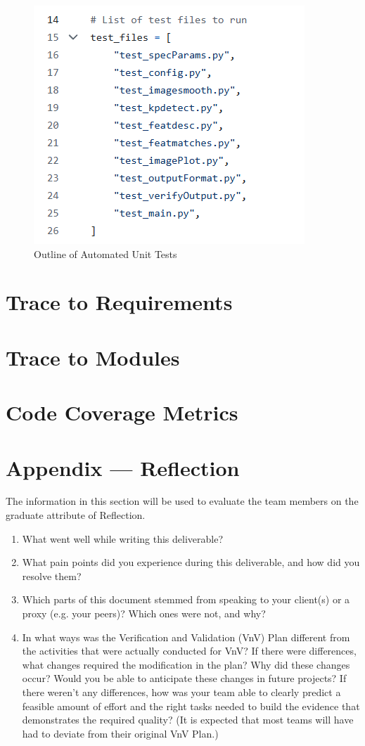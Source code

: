\documentclass[12pt, titlepage]{article}
\begin{document}
\begin{figure}
  \centering
  \includegraphics[width=0.5\linewidth]{images/unit_test_names.png}
  \caption{Outline of Automated Unit Tests}
  \label{unit_tests}
\end{figure}
		
\section{Trace to Requirements}
		
\section{Trace to Modules}		

\section{Code Coverage Metrics}




\newpage{}
\section*{Appendix --- Reflection}

The information in this section will be used to evaluate the team members on the
graduate attribute of Reflection.



\begin{enumerate}
  \item What went well while writing this deliverable? 
  \item What pain points did you experience during this deliverable, and how
    did you resolve them?
  \item Which parts of this document stemmed from speaking to your client(s) or
  a proxy (e.g. your peers)? Which ones were not, and why?
  \item In what ways was the Verification and Validation (VnV) Plan different
  from the activities that were actually conducted for VnV?  If there were
  differences, what changes required the modification in the plan?  Why did
  these changes occur?  Would you be able to anticipate these changes in future
  projects?  If there weren't any differences, how was your team able to clearly
  predict a feasible amount of effort and the right tasks needed to build the
  evidence that demonstrates the required quality?  (It is expected that most
  teams will have had to deviate from their original VnV Plan.)
\end{enumerate}
\end{document}
